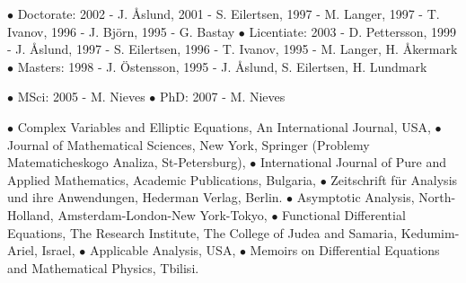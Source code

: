 \documentclass{article}
\begin{document}
\medskip

$\bullet$ Doctorate:
              2002 - J. {\AA}slund,
              2001 - S. Eilertsen,
              1997 - M. Langer,
              1997 - T. Ivanov,
              1996 - J. Bj\"orn,
              1995 - G. Bastay
$\bullet$ Licentiate:
2003 - D. Pettersson,
1999 - J. {\AA}slund,
              1997 - S. Eilertsen,
              1996 - T. Ivanov,
              1995 - M. Langer, H.
{\AA}kermark
   $\bullet$ Masters:
             1998 - J. {\"O}stensson,
              1995 - J. {\AA}slund, S.
Eilertsen, H. Lundmark

\medskip


\medskip
$\bullet$ MSci:
            2005 - M. Nieves
$\bullet$ PhD:
            2007 - M. Nieves



   \medskip

     $\bullet$ Complex Variables and Elliptic Equations,  An International Journal, USA,
      $\bullet$ Journal of Mathematical Sciences, New York, Springer
       (Problemy Matematicheskogo Analiza, St-Petersburg),
      $\bullet$ International Journal of Pure and Applied Mathematics, Academic Publications, Bulgaria,
        $\bullet$ Zeitschrift f{\"u}r Analysis und
ihre Anwendungen, Hederman Verlag,  Berlin.
     $\bullet$ Asymptotic Analysis,
North-Holland, Amsterdam-London-New York-Tokyo,
        $\bullet$ Functional Differential Equations,
The Research Institute, The
  College of Judea and Samaria, Kedumim-Ariel, Israel,
        $\bullet$ Applicable Analysis, USA,
 $\bullet$ Memoirs on Differential Equations and Mathematical Physics, Tbilisi.
\end{document}
